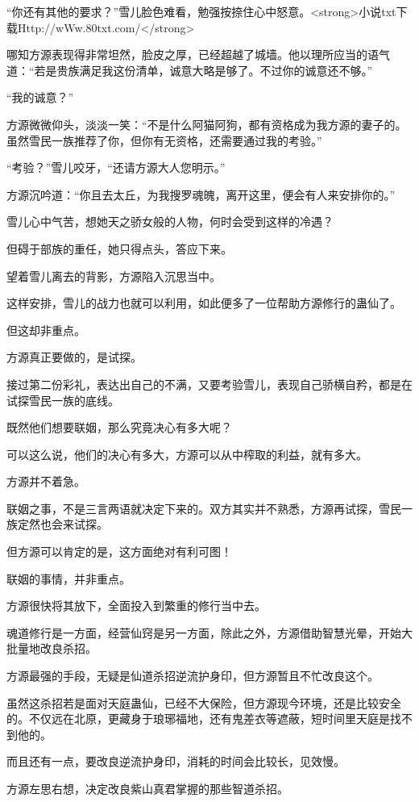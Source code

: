\begin{this_body}
“你还有其他的要求？”雪儿脸色难看，勉强按捺住心中怒意。<strong>小说txt下载Http://wWw.80txt.com/</strong>

哪知方源表现得非常坦然，脸皮之厚，已经超越了城墙。他以理所应当的语气道：“若是贵族满足我这份清单，诚意大略是够了。不过你的诚意还不够。”

“我的诚意？”

方源微微仰头，淡淡一笑：“不是什么阿猫阿狗，都有资格成为我方源的妻子的。虽然雪民一族推荐了你，但你有无资格，还需要通过我的考验。”

“考验？”雪儿咬牙，“还请方源大人您明示。”

方源沉吟道：“你且去太丘，为我搜罗魂魄，离开这里，便会有人来安排你的。”

雪儿心中气苦，想她天之骄女般的人物，何时会受到这样的冷遇？

但碍于部族的重任，她只得点头，答应下来。

望着雪儿离去的背影，方源陷入沉思当中。

这样安排，雪儿的战力也就可以利用，如此便多了一位帮助方源修行的蛊仙了。

但这却非重点。

方源真正要做的，是试探。

接过第二份彩礼，表达出自己的不满，又要考验雪儿，表现自己骄横自矜，都是在试探雪民一族的底线。

既然他们想要联姻，那么究竟决心有多大呢？

可以这么说，他们的决心有多大，方源可以从中榨取的利益，就有多大。

方源并不着急。

联姻之事，不是三言两语就决定下来的。双方其实并不熟悉，方源再试探，雪民一族定然也会来试探。

但方源可以肯定的是，这方面绝对有利可图！

联姻的事情，并非重点。

方源很快将其放下，全面投入到繁重的修行当中去。

魂道修行是一方面，经营仙窍是另一方面，除此之外，方源借助智慧光晕，开始大批量地改良杀招。

方源最强的手段，无疑是仙道杀招逆流护身印，但方源暂且不忙改良这个。

虽然这杀招若是面对天庭蛊仙，已经不大保险，但方源现今环境，还是比较安全的。不仅远在北原，更藏身于琅琊福地，还有鬼差衣等遮蔽，短时间里天庭是找不到他的。

而且还有一点，要改良逆流护身印，消耗的时间会比较长，见效慢。

方源左思右想，决定改良紫山真君掌握的那些智道杀招。


\end{this_body}
